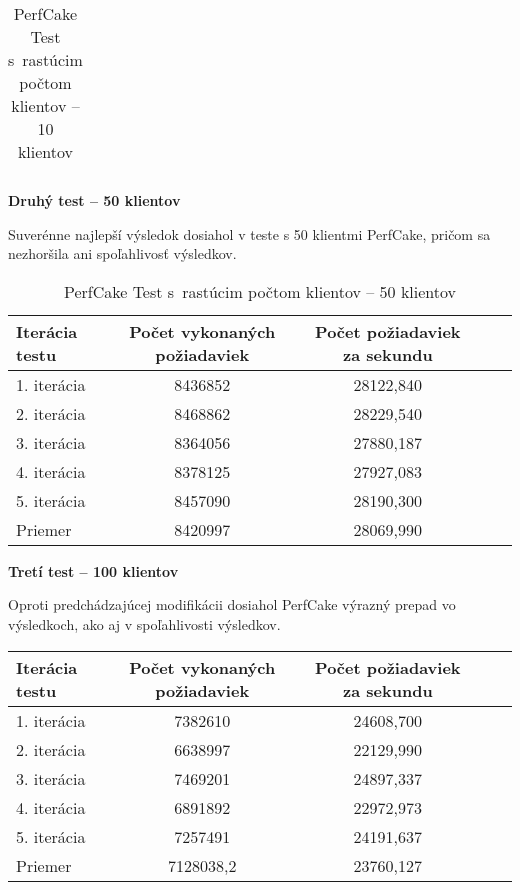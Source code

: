 \documentclass[12pt,oneside,final]{fithesis-utf8}
\begin{document}
\begin{itemize}
\begin{table}[H]
\begin{center}
\begin{tabular}{ | l | c | c | c | c |}
\end{tabular}
\end{center}
\caption{PerfCake Test s~rastúcim počtom klientov -- 10 klientov}
\end{table}


\textbf{Druhý test -- 50 klientov}

Suverénne najlepší výsledok dosiahol v teste s 50 klientmi PerfCake, pričom sa nezhoršila ani spoľahlivosť výsledkov.

\begin{table}[H]
\begin{center}
\begin{tabular}{ | l | c | c | c | c |}
		\hline
		 \textbf{Iterácia testu} & \textbf{Počet vykonaných požiadaviek} & \textbf{Počet požiadaviek za sekundu} \\ \hline
		 1. iterácia & 8436852 & 28122,840 \\ \hline
		 2. iterácia & 8468862 & 28229,540 \\ \hline
		 3. iterácia & 8364056 & 27880,187 \\ \hline
		 4. iterácia & 8378125 & 27927,083 \\ \hline
		 5. iterácia & 8457090 & 28190,300 \\ \hline
		 Priemer & 8420997 & 28069,990 \\ \hline
		 
\end{tabular}
\end{center}
\caption{PerfCake Test s~rastúcim počtom klientov -- 50 klientov}
\end{table}


\textbf{Tretí test -- 100 klientov}

Oproti predchádzajúcej modifikácii dosiahol PerfCake výrazný prepad vo výsledkoch, ako aj v spoľahlivosti výsledkov.

\begin{table}[H]
\begin{center}
\begin{tabular}{ | l | c | c | c | c |}
		\hline
		 \textbf{Iterácia testu} & \textbf{Počet vykonaných požiadaviek} & \textbf{Počet požiadaviek za sekundu} \\ \hline
		 1. iterácia & 7382610 & 24608,700 \\ \hline
		 2. iterácia & 6638997 & 22129,990 \\ \hline
		 3. iterácia & 7469201 & 24897,337 \\ \hline
		 4. iterácia & 6891892 & 22972,973 \\ \hline
		 5. iterácia & 7257491 & 24191,637 \\ \hline
		 Priemer & 7128038,2 & 23760,127 \\ \hline
		 

\end{tabular}
\end{center}
\end{table}
\end{itemize}
\end{document}
